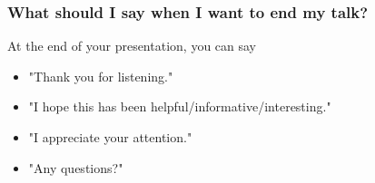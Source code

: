 \documentclass[aspectratio=169, t]{beamer}
\begin{document}
\begin{frame}
	\frametitle{What should I say when I want to end my talk?}

	At the end of your presentation, you can say
	\begin{itemize}
		\item "Thank you for listening."
		\item "I hope this has been helpful/informative/interesting."
		\item "I appreciate your attention."
		\item "Any questions?"
	\end{itemize}
\end{frame}

\end{document}
